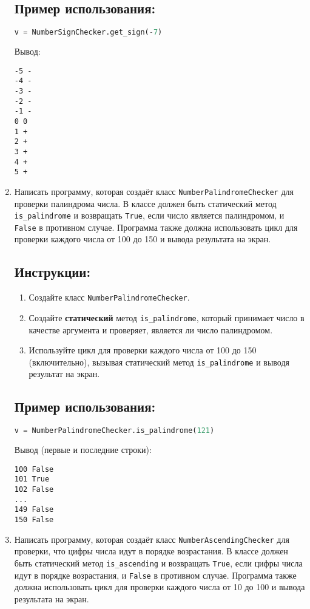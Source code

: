 \begin{enumerate}
\subsection*{Пример использования:}
\begin{lstlisting}[language=Python]
    v = NumberSignChecker.get_sign(-7)
\end{lstlisting}
Вывод:
\begin{verbatim}
-5 -
-4 -
-3 -
-2 -
-1 -
0 0
1 +
2 +
3 +
4 +
5 +
\end{verbatim}

\item
Написать программу, которая создаёт класс \texttt{NumberPalindromeChecker} 
для проверки палиндрома числа. В классе должен быть статический метод
\texttt{is\_palindrome} и возвращать \texttt{True}, если число является палиндромом, 
и \texttt{False} в противном случае. 
Программа также должна использовать цикл для проверки каждого числа от 
100 до 150 и вывода результата на экран.

\subsection*{Инструкции:}
\begin{enumerate}
    \item Создайте класс \texttt{NumberPalindromeChecker}.
    \item Создайте \textbf{статический} метод \texttt{is\_palindrome}, который принимает число в качестве аргумента и проверяет, является ли число палиндромом.
    \item Используйте цикл для проверки каждого числа от 100 до 150 (включительно), вызывая статический метод \texttt{is\_palindrome} и выводя результат на экран.
\end{enumerate}

\subsection*{Пример использования:}
\begin{lstlisting}[language=Python]
    v = NumberPalindromeChecker.is_palindrome(121)
\end{lstlisting}
Вывод (первые и последние строки):
\begin{verbatim}
100 False
101 True
102 False
...
149 False
150 False
\end{verbatim}

\item
Написать программу, которая создаёт класс \texttt{NumberAscendingChecker} 
для проверки, что цифры числа идут в порядке возрастания. В классе должен быть статический метод
\texttt{is\_ascending} и возвращать \texttt{True}, если цифры числа идут в порядке возрастания, 
и \texttt{False} в противном случае. 
Программа также должна использовать цикл для проверки каждого числа от 
10 до 100 и вывода результата на экран.


\end{enumerate}
